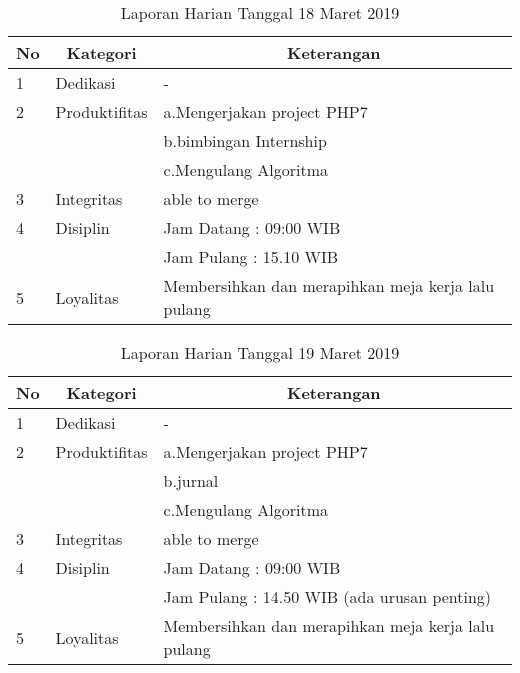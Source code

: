\begin{table}[htp]
\caption{Laporan Harian Tanggal 18 Maret 2019}
\label{tab:lh180319}
\begin{tabular}{|l|l|l|}
\hline
\textbf{No} & \multicolumn{1}{c|}{\textbf{Kategori}} & \multicolumn{1}{c|}{\textbf{Keterangan}} \\ \hline
1 & Dedikasi & - \\ \hline
2 & Produktifitas & a.Mengerjakan project PHP7 \\
   & & b.bimbingan Internship \\ \hline
   & & c.Mengulang Algoritma \\ \hline
3 & Integritas & able to merge \\ \hline
4 & Disiplin & Jam Datang : 09:00 WIB \\
   &  & Jam Pulang : 15.10 WIB \\ \hline
5 & Loyalitas & Membersihkan dan merapihkan meja kerja lalu pulang \\ \hline
\end{tabular}
\end{table}

\begin{table}[htp]
\caption{Laporan Harian Tanggal 19 Maret 2019}
\label{tab:lh190319}
\begin{tabular}{|l|l|l|}
\hline
\textbf{No} & \multicolumn{1}{c|}{\textbf{Kategori}} & \multicolumn{1}{c|}{\textbf{Keterangan}} \\ \hline
1 & Dedikasi & - \\ \hline
2 & Produktifitas & a.Mengerjakan project PHP7 \\
   & & b.jurnal \\ \hline
   & & c.Mengulang Algoritma \\ \hline
3 & Integritas & able to merge \\ \hline
4 & Disiplin & Jam Datang : 09:00 WIB \\
   &  & Jam Pulang : 14.50 WIB (ada urusan penting) \\ \hline
5 & Loyalitas & Membersihkan dan merapihkan meja kerja lalu pulang \\ \hline
\end{tabular}
\end{table}

